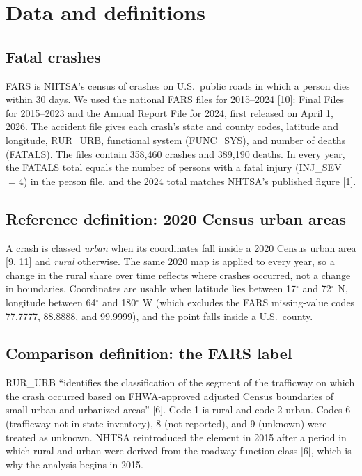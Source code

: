 \documentclass{article}
\begin{document}
\section{Data and definitions}

\subsection{Fatal crashes}

FARS is NHTSA's census of crashes on U.S.\ public roads in which a person dies within 30 days. We used the national FARS files for 2015--2024 [10]: Final Files for 2015--2023 and the Annual Report File for 2024, first released on April 1, 2026. The accident file gives each crash's state and county codes, latitude and longitude, RUR\_URB, functional system (FUNC\_SYS), and number of deaths (FATALS). The files contain 358{,}460 crashes and 389{,}190 deaths. In every year, the FATALS total equals the number of persons with a fatal injury (INJ\_SEV $=4$) in the person file, and the 2024 total matches NHTSA's published figure [1].

\subsection{Reference definition: 2020 Census urban areas}

A crash is classed \emph{urban} when its coordinates fall inside a 2020 Census urban area [9, 11] and \emph{rural} otherwise. The same 2020 map is applied to every year, so a change in the rural share over time reflects where crashes occurred, not a change in boundaries. Coordinates are usable when latitude lies between 17$^\circ$ and 72$^\circ$ N, longitude between 64$^\circ$ and 180$^\circ$ W (which excludes the FARS missing-value codes 77.7777, 88.8888, and 99.9999), and the point falls inside a U.S.\ county.

\subsection{Comparison definition: the FARS label}

RUR\_URB ``identifies the classification of the segment of the trafficway on which the crash occurred based on FHWA-approved adjusted Census boundaries of small urban and urbanized areas'' [6]. Code 1 is rural and code 2 urban. Codes 6 (trafficway not in state inventory), 8 (not reported), and 9 (unknown) were treated as unknown. NHTSA reintroduced the element in 2015 after a period in which rural and urban were derived from the roadway function class [6], which is why the analysis begins in 2015.
\end{document}
